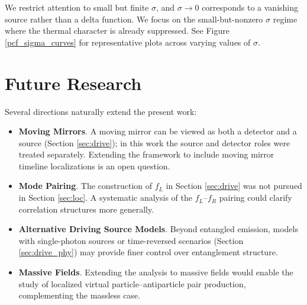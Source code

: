 \documentclass[12pt,a4paper]{article}
\begin{document}
{We restrict attention to small but finite $\sigma$, and $\sigma \rightarrow 0$ corresponds to a vanishing source rather than a delta function. We focus on the small-but-nonzero $\sigma$ regime where the thermal character is already suppressed. See Figure \ref{pcf_sigma_curves} for representative plots across varying values of $\sigma$.

\section{Future Research} \label{sec:future}

Several directions naturally extend the present work:
\begin{itemize}
\item {\bf Moving Mirrors}. A moving mirror can be viewed as both a detector and a source (Section \ref{sec:drive}); in this work the source and detector roles were treated separately. Extending the framework to include moving mirror timeline localizations is an open question.

\item {\bf Mode Pairing}. The construction of $f_L$ in Section \ref{sec:drive} was not pursued in Section \ref{sec:loc}. A systematic analysis of the $f_L$–$f_R$ pairing could clarify correlation structures more generally.

\item {\bf Alternative Driving Source Models}. Beyond entangled emission, models with single-photon sources or time-reversed scenarios (Section \ref{sec:drive_phy}) may provide finer control over entanglement structure.

\item {\bf Massive Fields}. Extending the analysis to massive fields would enable the study of localized virtual particle–antiparticle pair production, complementing the massless case.


\end{itemize}

}
\end{document}
